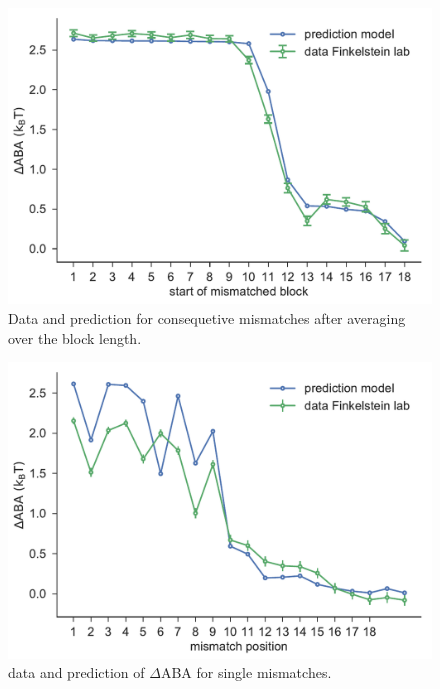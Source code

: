 \documentclass[a4paper,twoside]{revtex4-1}
\begin{document}
\begin{figure}[H]
	\centering
	\includegraphics[width=\textwidth]{blocks_collapse_first_position}
	\caption{Data and prediction for consequetive mismatches after averaging over the block length. }
\end{figure}

\begin{figure}[H]
	\centering
	\includegraphics[width=\textwidth]{single_mm}
	\caption{data and prediction of $\Delta$ABA for single mismatches.  }
\end{figure}




\newpage 
\end{document}
